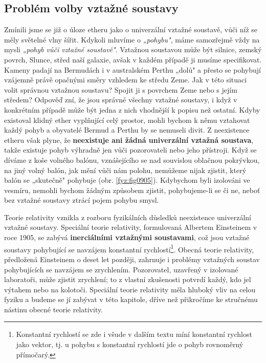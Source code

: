     \subsection{Problém volby vztažné soustavy}
      Zmínili jsme se již o úloze etheru jako o univerzální vztažné soustavě, vůči níž se měly
      světelné vlny šířit. Kdykoli mluvíme o \emph{„pohybu"}, máme samozřejmě vždy na mysli
      \emph{„pohyb vůči vztažné soustavě"}. Vztažnou soustavou může být silnice, zemský povrch,
      Slunce, střed naší galaxie, avšak v každém případě ji musíme specifikovat. Kameny padají na
      Bermudách i v australském Perthu „dolů" a přesto se pohybují vzájemně právě opačnými směry
      vzhledem ke středu Zeme. Jak v této situaci volit správnou vztažnou soustavu? Spojit ji s
      povrchem Zeme nebo s jejím středem? Odpověď zní, že jsou správné všechny vztažné soustavy, i
      když v konkrétním případě může být jedna z nich vhodnější k popisu než ostatní. Kdyby
      existoval klidný ether vyplňující celý prostor, mohli bychom k němu vztahovat každý pohyb a
      obyvatelé Bermud a Perthu by se nemuseli divit. Z neexistence etheru však plyne, že
      \textbf{neexistuje ani žádná univerzální vztažná soustava}, takže existuje pohyb výhradně jen
      vůči pozorovateli nebo jeho přístroji. Když se díváme z koše volného balónu, vznášejícího se
      nad souvislou oblačnou pokrývkou, na jiný volný balón, jak mění vůči nám polohu, nemůžeme
      nijak zjistit, který balón se „skutečně" pohybuje (obr. \ref{fyz:fig0905}). Kdybychom byli
      izolováni ve vesmíru, nemohli bychom žádným způsobem zjistit, pohybujeme-li se či ne, neboť
      bez vztažné soustavy ztrácí pojem pohybu smysl.


      Teorie relativity vznikla z rozboru fyzikálních důsledků neexistence univerzální vztažné
      soustavy. Speciální teorie relativity, formulovaná Albertem Einsteinem v roce 1905, se zabývá
      \textbf{inerciálními vztažnými soustavami}, což jsou vztažné soustavy pohybující se navzájem
      konstantní rychlostí\footnote{Konstantní rychlostí se zde i všude v dalším textu míní
      konstantní rychlost jako vektor, tj. u pohybu s konstantní rychlostí jde o pohyb rovnoměrný
      přímočarý.}. Obecná teorie relativity, předložená Einsteinem o deset let později, zahrnuje i
      problémy vztažných soustav pohybujících se navzájem se zrychlením. Pozorovatel, uzavřený v
      izolované laboratoři, může zjistit zrychlení; to z vlastní zkušenosti potvrdí každý, kdo jel
      výtahem nebo na kolotoči. Speciální teorie relativity měla hluboký vliv na celou fyziku a
      budeme se jí zabývat v této kapitole, dříve než přikročíme ke stručnému nástinu obecné teorie
      relativity.

